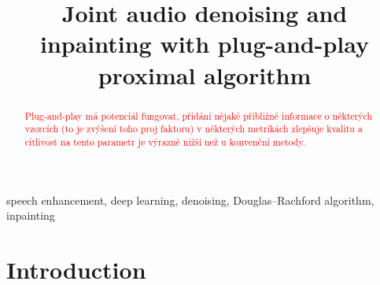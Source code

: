 \documentclass[conference]{IEEEtran}
\newcommand{\todo}[1]{\textcolor{red}{#1}}
\begin{document}

\title{Joint audio denoising and inpainting with plug-and-play proximal algorithm}

\author{
\and
{}
}

\maketitle

\begin{abstract}
\todo{Plug-and-play má potenciál fungovat, přidání nějaké přibližné informace o některých vzorcích (to je zvýšení toho proj faktoru) v některých metrikách zlepšuje kvalitu a citlivost na tento parametr je výrazně nižší než u konvenční metody.}
\end{abstract}

\begin{IEEEkeywords}
speech enhancement, deep learning, denoising, Douglas--Rachford algorithm, inpainting
\end{IEEEkeywords}

\section{Introduction}
\end{document}
